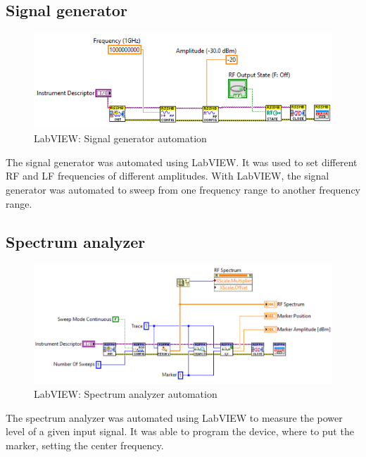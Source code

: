 \documentclass[12pt,a4paper,bold]{thesis}
\theoremstyle{thm}
\theoremstyle{definition}
\begin{document}
\subsection{Signal generator}
\begin{figure}[H]
	\centering
   \includegraphics[scale=0.56]{Images/50.png} 
   \caption{LabVIEW: Signal generator automation}
\end{figure}
The signal generator was automated using LabVIEW. It was used to set different RF and LF frequencies of different amplitudes. With LabVIEW, the signal generator was automated to sweep from one frequency range to another frequency range.
\subsection{Spectrum analyzer}
\begin{figure}[H]
	\centering
   \includegraphics[scale=0.56]{Images/51.png} 
   \caption{LabVIEW: Spectrum analyzer automation}
\end{figure}
The spectrum analyzer was automated using LabVIEW to measure the power level of a given input signal. It was able to program the device, where to put the marker, setting the center frequency.
\end{document}
